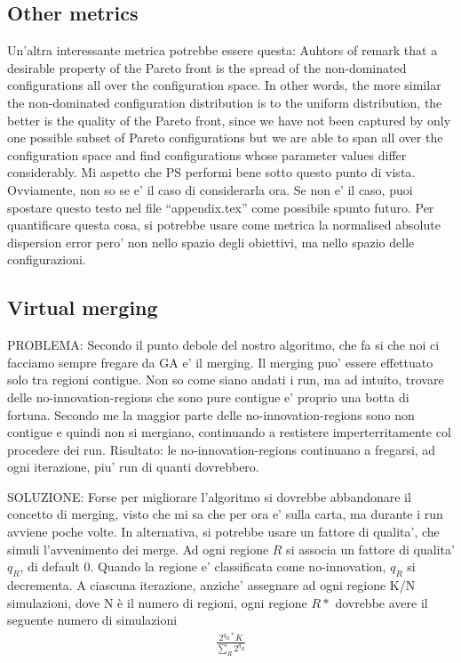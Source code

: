 \subsection{Other metrics}
Un'altra interessante metrica potrebbe essere questa: Auhtors of \cite{zitzler_ec00} remark that a desirable property of the Pareto front is the spread of the non-dominated configurations all over the configuration space. In other words, the more similar the non-dominated configuration distribution is to the uniform distribution, the better is the quality of the Pareto front, since we have not been captured by only one possible subset of Pareto configurations but we are able to span all over the configuration space and find configurations whose parameter values differ considerably. Mi aspetto che PS performi bene sotto questo punto di vista. Ovviamente, non so se e' il caso di considerarla ora. Se non e' il caso, puoi spostare questo testo nel file ``appendix.tex'' come possibile spunto futuro. Per quantificare questa cosa, si potrebbe usare come metrica la normalised absolute dispersion error pero' non nello spazio degli obiettivi, ma nello spazio delle configurazioni.

\subsection{Virtual merging}
PROBLEMA: Secondo il punto debole del nostro algoritmo, che fa si che noi ci facciamo sempre fregare da GA e' il merging. Il merging puo' essere effettuato solo tra regioni contigue. Non so come siano andati i run, ma ad intuito, trovare delle no-innovation-regions che sono pure contigue e' proprio una botta di fortuna. Secondo me la maggior parte delle no-innovation-regions sono non contigue e quindi non si mergiano, continuando a restistere imperterritamente col procedere dei run. Risultato: le no-innovation-regions continuano a fregarsi, ad ogni iterazione, piu' run di quanti dovrebbero.

SOLUZIONE: Forse per migliorare l'algoritmo si dovrebbe abbandonare il concetto di merging, visto che mi sa che per ora e' sulla carta, ma durante i run avviene poche volte. In alternativa, si potrebbe usare un fattore di qualita', che simuli l'avvenimento dei merge. Ad ogni regione $R$ si associa un fattore di qualita' $q_R$, di default 0. Quando la regione e' classificata come no-innovation, $q_R$ si decrementa. A ciascuna iterazione, anziche' assegnare ad ogni regione K/N simulazioni, dove N è il numero di regioni, ogni regione $R*$ dovrebbe avere il seguente numero di simulazioni
	\begin{align}
    \frac{2^{q_R*} K} { \sum_R  2^{q_R} }
	\end{align}

